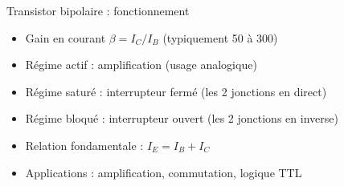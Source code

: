 \begin{frame}{Transistor bipolaire : fonctionnement}
\begin{itemize}
    \item Gain en courant $\beta = I_C / I_B$ (typiquement 50 à 300)
    \item Régime actif : amplification (usage analogique)
    \item Régime saturé : interrupteur fermé (les 2 jonctions en direct)
    \item Régime bloqué : interrupteur ouvert (les 2 jonctions en inverse)
    \item Relation fondamentale : $I_E = I_B + I_C$
    \item Applications : amplification, commutation, logique TTL
\end{itemize}
\end{frame}
%

